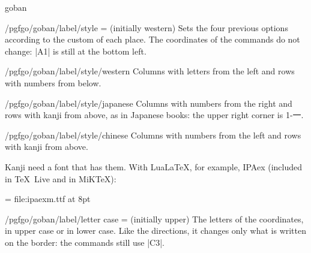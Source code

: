 \begin{environment}{{goban}}
	\begin{key}{/pgfgo/goban/label/style =  (initially western)}
		Sets the four previous options according to the custom of each place. The coordinates of the commands do not change: |A1| is still at the bottom left.

		\begin{stylekey}{/pgfgo/goban/label/style/western}
			Columns with letters from the left and rows with numbers from below.
		\end{stylekey}

		\begin{stylekey}{/pgfgo/goban/label/style/japanese}
			Columns with numbers from the right and rows with kanji from above, as in Japanese books: the upper right corner is 1-{\pgfgokanji 一}.
		\end{stylekey}

		\begin{stylekey}{/pgfgo/goban/label/style/chinese}
			Columns with numbers from the left and rows with kanji from above.
		\end{stylekey}

		Kanji need a font that has them. With Lua\LaTeX, for example, IPAex (included in \TeX\ Live and in MiK\TeX):

		\begin{codeexample}[]
			\font\kanji = {file:ipaexm.ttf} at 8pt
			\begin{goban}[9, label = {at = {north, east}, style = japanese, font = \kanji}]
			\end{goban}
		\end{codeexample}
	\end{key}

	\begin{key}{/pgfgo/goban/label/letter case =  (initially upper)}
		The letters of the coordinates, in upper case or in lower case. Like the directions, it changes only what is written on the border: the commands still use |C3|.

		\begin{codeexample}[]
			\begin{goban}[5, label = {at = {south, west}, letter case = lower}]
			\end{goban}
		\end{codeexample}
	\end{key}

\end{environment}
